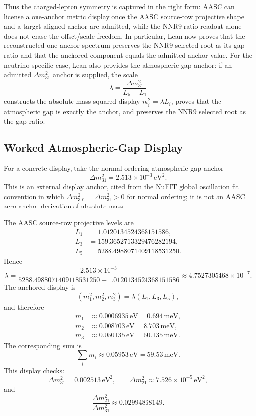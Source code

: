 \documentclass[11pt]{article}
\begin{document}
Thus the charged-lepton symmetry is captured in the right form: AASC can
license a one-anchor metric display once the AASC source-row projective shape
and a target-aligned anchor are admitted, while the NNR9 ratio readout alone
does not erase the offset/scale freedom.  In particular, Lean now proves that
the reconstructed one-anchor spectrum preserves the NNR9 selected root as its
gap ratio and that the anchored component equals the admitted anchor value.
For the neutrino-specific case, Lean also provides the atmospheric-gap anchor:
if an admitted \(\Delta m^2_{31}\) anchor is supplied, the scale
\[
  \lambda =
  \frac{\Delta m^2_{31}}{L_5-L_1}
\]
constructs the absolute mass-squared display \(m_i^2=\lambda L_i\), proves
that the atmospheric gap is exactly the anchor, and preserves the NNR9 selected
root as the gap ratio.

\subsection{Worked Atmospheric-Gap Display}

For a concrete display, take the normal-ordering atmospheric gap anchor
\[
  \Delta m^2_{31}=2.513\times 10^{-3}\,\mathrm{eV}^2.
\]
This is an external display anchor, cited from the NuFIT global oscillation
fit convention in which \(\Delta m^2_{3\ell}=\Delta m^2_{31}>0\) for normal
ordering; it is not an AASC zero-anchor derivation of absolute mass.

The AASC source-row projective levels are
\[
\begin{aligned}
L_1&=1.0120134524368151586,\\
L_3&=159.3652713329476282194,\\
L_5&=5288.4988071409118531250.
\end{aligned}
\]
Hence
\[
  \lambda =
  \frac{2.513\times 10^{-3}}{5288.4988071409118531250
    -1.0120134524368151586}
  \approx 4.7527305468\times 10^{-7}.
\]
The anchored display is
\[
  (m_1^2,m_2^2,m_3^2)=
  \lambda(L_1,L_3,L_5),
\]
and therefore
\[
\begin{aligned}
m_1&\approx 0.0006935\,\mathrm{eV}
      =0.694\,\mathrm{meV},\\
m_2&\approx 0.008703\,\mathrm{eV}
      =8.703\,\mathrm{meV},\\
m_3&\approx 0.050135\,\mathrm{eV}
      =50.135\,\mathrm{meV}.
\end{aligned}
\]
The corresponding sum is
\[
  \sum_i m_i \approx 0.05953\,\mathrm{eV}
  =59.53\,\mathrm{meV}.
\]
This display checks:
\[
  \Delta m^2_{31}=0.002513\,\mathrm{eV}^2,\qquad
  \Delta m^2_{21}\approx 7.526\times 10^{-5}\,\mathrm{eV}^2,
\]
and
\[
  \frac{\Delta m^2_{21}}{\Delta m^2_{31}}
  \approx 0.02994868149.
\]
\end{document}
